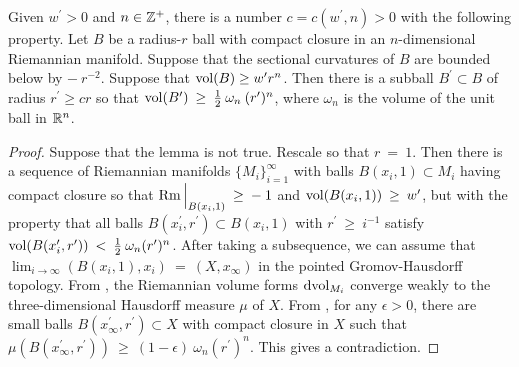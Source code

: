 \begin{lemma}
  \label{lem:kl-earlier-scalar-curvature-bounds-smaller-balls-from-lower-curvature-bound-existence-scalar-curvature}
 \label{Alexlemma}
Given $w^\prime > 0$ and $n \in {\mathbb Z}^+$, there is a number $c = c(w^\prime,n) > 0$ with the
following property.
Let $B$ be a radius-$r$ ball with compact closure in an $n$-dimensional Riemannian
manifold. Suppose that the sectional curvatures of $B$ are bounded below by
$- \: r^{-2}$.
Suppose that $\operatorname{vol}(B) \ge w^\prime r^n$. Then there is a subball $B^\prime \subset B$ of
radius $r^\prime \ge cr$ so that $\operatorname{vol}(B^\prime) \: \ge \: \frac12 \: \omega_n \:
(r^\prime)^n$, where $\omega_n$ is the volume of the unit ball in ${\mathbb R}^n$.
\end{lemma}
\begin{proof}
Suppose that the lemma is not true. Rescale
so that $r \: = \: 1$. Then there is a sequence of Riemannian
manifolds $\{M_i\}_{i=1}^\infty$ with balls $B(x_i, 1) \subset M_i$
having compact closure
so that $\operatorname{Rm} \Big|_{B(x_i, 1)} \: \ge \: - \: 1$ and
$\operatorname{vol}(B(x_i, 1)) \: \ge \: w^\prime$, but with the property that all balls
$B(x_i^\prime, r^\prime) \subset B(x_i, 1)$ with $r^\prime \: \ge \:
i^{-1}$ satisfy
$\operatorname{vol}(B(x_i^\prime, r^\prime)) \: < \: \frac{1}{2} \: \omega_n
(r^\prime)^n$. After taking a subsequence, we can assume that
$\lim_{i \rightarrow \infty} (B(x_i, 1), x_i) \: = \: (X, x_\infty)$ in the
pointed Gromov-Hausdorff topology. From
\cite[Theorem 10.8]{Burago-Gromov-Perelman}, the Riemannian volume
forms $\operatorname{dvol}_{M_i}$ converge weakly to the three-dimensional Hausdorff
measure $\mu$ of $X$. From \cite[Corollary 6.7 and
Section 9]{Burago-Gromov-Perelman}, for any $\epsilon > 0$,
there are small balls $B(x_\infty^\prime,
r^\prime) \subset X$ with compact closure in $X$ such that $\mu(B(x_\infty^\prime,
r^\prime)) \: \ge \: (1-\epsilon) \: \omega_n (r^\prime)^n$.
This gives a contradiction.
\end{proof}


